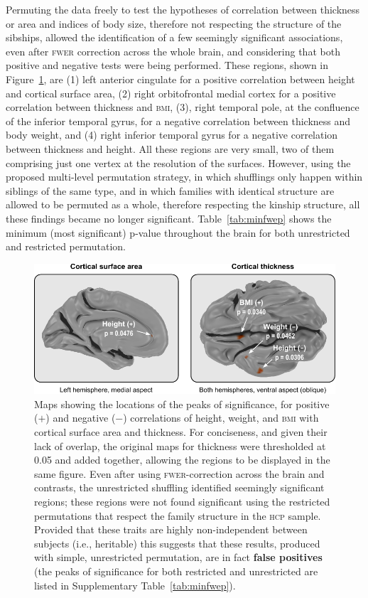 Permuting the data freely to test the hypotheses of correlation between thickness or area and indices of body size, therefore not respecting the structure of the sibships, allowed the identification of a few seemingly significant associations, even after \textsc{fwer} correction across the whole brain, and considering that both positive and negative tests were being performed. These regions, shown in Figure~\ref{fig:realdata}, are (1) left anterior cingulate for a positive correlation between height and cortical surface area, (2) right orbitofrontal medial cortex for a positive correlation between thickness and \textsc{bmi}, (3), right temporal pole, at the confluence of the inferior temporal gyrus, for a negative correlation between thickness and body weight, and (4) right inferior temporal gyrus for a negative correlation between thickness and height. All these regions are very small, two of them comprising just one vertex at the resolution of the surfaces. However, using the proposed multi-level permutation strategy, in which shufflings only happen within siblings of the same type, and in which families with identical structure are allowed to be permuted as a whole, therefore respecting the kinship structure, all these findings became no longer significant. Table~\ref{tab:minfwep} shows the minimum (most significant) p-value throughout the brain for both unrestricted and restricted permutation.

\begin{figure}[!tbp]
\centering
\includegraphics{figures/realdata.pdf}
\caption{Maps showing the locations of the peaks of significance, for positive ($+$) and negative ($-$) correlations of height, weight, and \textsc{bmi} with cortical surface area and thickness. For conciseness, and given their lack of overlap, the original maps for thickness were thresholded at 0.05 and added together, allowing the regions to be displayed in the same figure. Even after using \textsc{fwer}-correction across the brain and contrasts, the unrestricted shuffling identified seemingly significant regions; these regions were not found significant using the restricted permutations that respect the family structure in the \textsc{hcp} sample. Provided that these traits are highly non-independent between subjects (i.e., heritable) this suggests that these results, produced with simple, unrestricted permutation, are in fact \textbf{false positives} (the peaks of significance for both restricted and unrestricted are listed in Supplementary Table~\ref{tab:minfwep}).}
\label{fig:realdata}
\end{figure}

